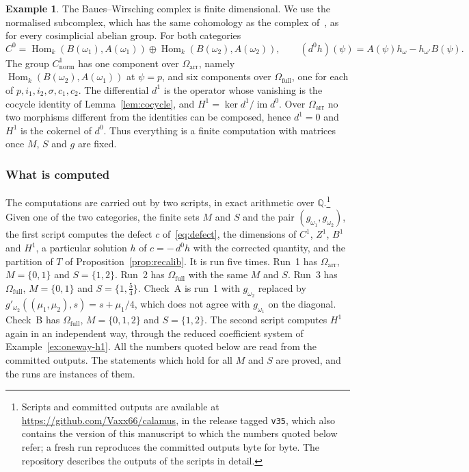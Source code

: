 \documentclass[11pt,a4paper]{article}
\theoremstyle{plain}
\theoremstyle{definition}
\newtheorem{example}[theorem]{Example}
\theoremstyle{remark}
\newcommand{\cat}[1]{\mathsf{#1}}
\newcommand{\catO}{\cat{\Omega}}
\DeclareMathOperator{\Hom}{Hom}
\begin{document}
\begin{example}
The Baues--Wirsching complex is finite dimensional. We use the normalised
subcomplex, which has the same cohomology as the complex
of~\cite[(1.4)]{baues_cohomology_1985}, as for every cosimplicial abelian
group. For both categories
\[
C^{0} = \Hom_k(B(\omega_1), A(\omega_1)) \oplus \Hom_k(B(\omega_2),
A(\omega_2)),
\qquad
(d^{0}h)(\psi) = A(\psi)h_\omega - h_{\omega'}B(\psi).
\]
The group $C^{1}_{\mathrm{norm}}$ has one component over
$\catO_{\mathrm{arr}}$, namely $\Hom_k(B(\omega_2),A(\omega_1))$ at
$\psi = p$, and six components over $\catO_{\mathrm{full}}$, one for each of
$p, i_1, i_2, \sigma, c_1, c_2$. The differential $d^{1}$ is the operator
whose vanishing is the cocycle identity of Lemma~\ref{lem:cocycle}, and
$H^{1} = \ker d^{1}/\operatorname{im} d^{0}$. Over $\catO_{\mathrm{arr}}$ no
two morphisms different from the identities can be composed, hence
$d^{1} = 0$ and $H^{1}$ is the cokernel of $d^{0}$. Thus everything is a
finite computation with matrices once $M$, $S$ and $g$ are fixed.
\end{example}

\subsubsection*{What is computed}

The computations are carried out by two scripts, in exact arithmetic over
$\mathbb{Q}$.\footnote{Scripts and committed outputs are available at
\url{https://github.com/Vaxx66/calamus}, in the release tagged
\texttt{v35}, which also contains the version of this manuscript to which
the numbers quoted below refer; a fresh run reproduces the committed outputs
byte for byte. The repository describes the outputs of the scripts in
detail.} Given one of the two categories, the finite sets $M$ and $S$ and the
pair $(g_{\omega_1}, g_{\omega_2})$, the first script computes the defect $c$
of~\eqref{eq:defect}, the dimensions of $C^{1}$, $Z^{1}$, $B^{1}$ and $H^{1}$,
a particular solution $h$ of $c = -\,d^{0}h$ with the corrected quantity, and
the partition of $T$ of Proposition~\ref{prop:recalib}. It is run five times.
Run~1 has $\catO_{\mathrm{arr}}$, $M = \{0,1\}$ and $S = \{1,2\}$. Run~2 has
$\catO_{\mathrm{full}}$ with the same $M$ and $S$. Run~3 has
$\catO_{\mathrm{full}}$, $M = \{0,1\}$ and $S = \{1,\tfrac54\}$. Check~A is
run~1 with $g_{\omega_2}$ replaced by
$g'_{\omega_2}((\mu_1,\mu_2),s) = s + \mu_1/4$, which does not agree with
$g_{\omega_1}$ on the diagonal. Check~B has $\catO_{\mathrm{full}}$,
$M = \{0,1,2\}$ and $S = \{1,2\}$. The second script computes $H^{1}$ again in
an independent way, through the reduced coefficient system of
Example~\ref{ex:oneway-h1}. All the numbers quoted below are read from the
committed outputs. The statements which hold for all $M$ and $S$ are proved,
and the runs are instances of them.
\end{document}
